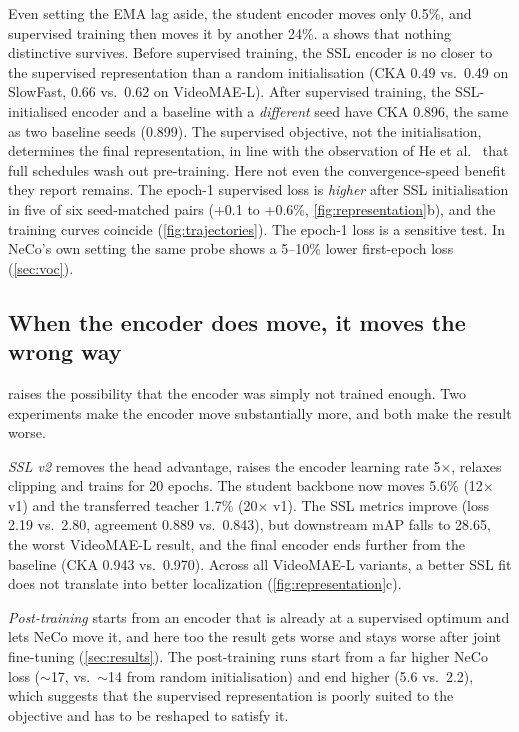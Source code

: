 \documentclass[10pt,a4paper]{article}
\begin{document}
Even setting the EMA lag aside, the student encoder moves only 0.5\%, and supervised
training then moves it by another 24\%. a shows that nothing
distinctive survives. Before supervised training, the SSL encoder is no closer to the
supervised representation than a random initialisation (CKA 0.49 vs.\ 0.49 on SlowFast,
0.66 vs.\ 0.62 on VideoMAE-L). After supervised training, the SSL-initialised encoder and a
baseline with a \emph{different} seed have CKA 0.896, the same as two baseline seeds (0.899).
The supervised objective, not the initialisation, determines the final representation, in
line with the observation of He et al.~\cite{he2019rethinking} that full schedules wash out
pre-training. Here not even the convergence-speed benefit they report remains. The
epoch-1 supervised loss is \emph{higher} after SSL initialisation in five of six
seed-matched pairs (+0.1 to +0.6\%, \cref{fig:representation}b), and the training curves
coincide (\cref{fig:trajectories}). The epoch-1 loss is a sensitive test. In NeCo's own
setting the same probe shows a 5--10\% lower first-epoch loss (\cref{sec:voc}).

\subsection{When the encoder does move, it moves the wrong way}\label{sec:why-wrong}

 raises the possibility that the encoder was simply not trained
enough. Two experiments make the encoder move substantially more, and both make the
result worse.

\emph{SSL v2} removes the head advantage, raises the encoder learning rate 5$\times$,
relaxes clipping and trains for 20 epochs. The student backbone now moves 5.6\% (12$\times$
v1) and the transferred teacher 1.7\% (20$\times$ v1). The SSL metrics improve (loss 2.19 vs.\
2.80, agreement 0.889 vs.\ 0.843), but downstream mAP falls to 28.65, the worst VideoMAE-L
result, and the final encoder ends further from the baseline (CKA 0.943 vs.\ 0.970).
Across all VideoMAE-L variants, a better SSL fit does not translate into better
localization (\cref{fig:representation}c).

\emph{Post-training} starts from an encoder that is already at a supervised optimum and
lets NeCo move it, and here too the result gets worse and stays worse after joint
fine-tuning (\cref{sec:results}). The post-training runs start from a far higher NeCo loss
($\sim$17, vs.\ $\sim$14 from random initialisation) and end higher (5.6 vs.\ 2.2), which
suggests that the supervised representation is poorly suited to the objective and has to
be reshaped to satisfy it.
\end{document}
